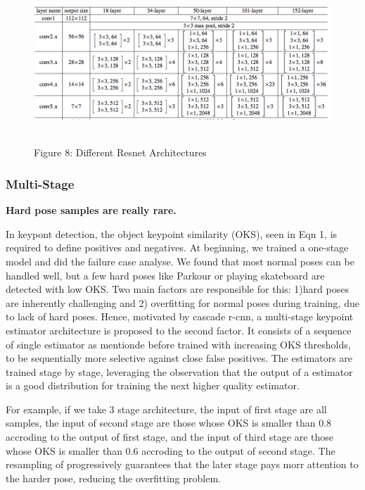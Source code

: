 \captionsetup[figure]{labelformat=empty}
\begin{figure}[htbp]
  \centering
  \includegraphics[width=16cm,height=6cm]{source/resnet.png}
  \caption{Figure 8: Different Resnet Architectures}
\end{figure}

\subsubsection{Multi-Stage}

\textbf{Hard pose samples are really rare.}

In keypont detection, the object keypoint similarity (OKS), seen in Eqn 1, is required to define positives and negatives.
At beginning, we trained a one-stage model and did the failure case analyse.
We found that most normal poses can be handled well, but a few hard poses like Parkour or playing skateboard are detected with low OKS.
Two main factors are responsible for this: 1)hard poses are inherently challenging  and 2) overfitting for normal poses during training, due to lack of hard poses.
Hence, motivated by cascade r-cnn\cite{cai2017cascade}, a multi-stage keypoint estimator architecture is proposed to the second factor.
It consists of a sequence of single estimator as mentionde before trained with increasing OKS thresholds, to be sequentially more selective against close false positives.
The estimators are trained stage by stage, leveraging the observation that the output of a estimator is a good distribution for training the next higher quality estimator.

For example, if we take 3 stage architecture, the input of first stage are all samples,
the input of second stage are those whose OKS is smaller than 0.8 accroding to the output of first stage,
and the input of third stage are those whose OKS is smaller than 0.6 accroding to the output of second stage.
The resampling of progressively guarantees that the later stage pays morr attention to the harder pose, reducing
the overfitting problem.

